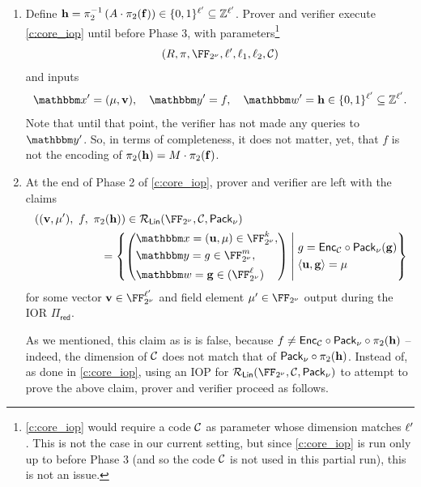 \documentclass[11pt,letterpaper,usenames,dvipsnames]{article}
\begin{document}
\begin{construction}
 \begin{enumerate}[leftmargin=*]
     \item Define  $\mathbf{h} = \pi_2^{-1}\left(A\cdot \pi_2(\mathbf{f})\right) \in \{0,1\}^{\ell'} \subseteq \mathbb{Z}^{\ell'}$. %
 Prover and verifier execute \cref{c:core_iop} until before Phase 3, with parameters\footnote{\cref{c:core_iop} would require a code $\mathcal{C}$ as parameter whose dimension matches $\ell'$. This is not the case in our current setting, but since \cref{c:core_iop} is run only up to before Phase 3 (and so the code $\mathcal{C}$ is not used in this partial run), this is not an issue.}
     $$
     (\evalfield,\ringmorphism, \comfield, \codedim', \codedim_1, \codedim_2, \cC)
     $$ 
     and inputs 
    $$
    \inp' = (\mu, \vv),  \quad \oracle'=f,\quad  \wit' = \bfh \in \{0,1\}^{\codedim'} \subseteq \ZZ^{\codedim'}.
    $$
     Note that until that point, the verifier has not made any queries to $\oracle'$. So, in terms of completeness, it does not matter, yet, that $f$ is not the encoding of $\pi_2(\mathbf{h})=M\cdot \pi_2(\mathbf{f})$.
 \item  At the end of Phase 2 of \cref{c:core_iop}, prover and verifier are left with the claims 
\begin{align*}\label{e:iopp_mle_claims_2}
&\left((\vv, \mu'), \ f, \ \picomfield(\bfh)\right) \in \LIN( \comfield,\cC,\pack) \\& \qquad\qquad\qquad = \left\{ \left(\begin{aligned} &\inp=(\uu,\mu)\in \comfield^\inplen, \\&\oracle = g \in \comfield^{\codelength}, \\ &\wit= \bfg\in (\comfield^\codedim)\end{aligned}\right) \;\middle|\;  \begin{aligned} 
&g=\Enc_{\cC}\circ \pack (\bfg) \\    &\langle \uu, \bfg\rangle = \mu  \end{aligned}\right\}
\end{align*} for some vector $\vv\in\comfield^{\codedim'}$  and field element $\mu'\in \comfield$ output during the IOR $\Pi_{\mathsf{red}}$. 

As we mentioned, this claim as is is false, because $f\neq \mathsf{Enc}_{\mathcal{C}}\circ \mathsf{Pack}_\nu\circ \pi_2(\mathbf{h})$ --indeed, the dimension of $\mathcal{C}$ does not match that of $\mathsf{Pack}_\nu\circ \pi_2(\mathbf{h})$. Instead of, as done in \cref{c:core_iop}, using an IOP for $\LIN( \comfield,\cC,\pack)$ to attempt to prove the above claim, prover and verifier proceed as follows.


\end{enumerate}
\end{construction}
\end{document}
